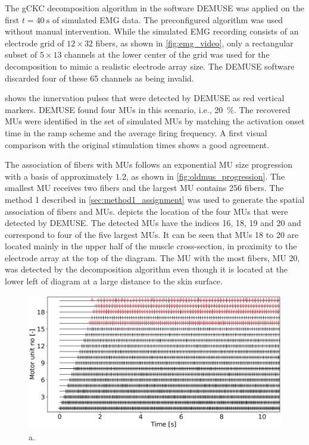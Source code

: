 The gCKC decomposition algorithm in the software DEMUSE was applied on the first $t=\SI{40}{\second}$ of simulated EMG data. The preconfigured algorithm was used without manual intervention.
While the simulated EMG recording consists of an electrode grid of $12 \times 32$ fibers, as shown in \cref{fig:emg_video}, only a rectangular subset of $5\times 13$ channels at the lower center of the grid was used for the decomposition to mimic a realistic electrode array size. The DEMUSE software discarded four of these 65 channels as being invalid.

 shows the innervation pulses that were detected by DEMUSE as red vertical markers. DEMUSE found four MUs in this scenario, i.e., \SI{20}{\percent}. 
The recovered MUs were identified in the set of simulated MUs by matching the activation onset time in the ramp scheme and the average firing frequency. A first visual comparison with the original stimulation times shows a good agreement.

The association of fibers with MUs follows an exponential MU size progression with a basis of approximately $1.2$, as shown in \cref{fig:oldmus_progression}. The smallest MU receives two fibers and the largest MU contains 256 fibers. The method 1 described in \cref{sec:method1_assignment} was used to generate the spatial association of fibers and MUs.  depicts the location of the four MUs that were detected by DEMUSE. The detected MUs have the indices 16, 18, 19 and 20 and correspond to four of the five largest MUs. It can be seen that MUs 18 to 20 are located mainly in the upper half of the muscle cross-section, in proximity to the electrode array at the top of the diagram.
The MU with the most fibers, MU 20, was detected by the decomposition algorithm even though it is located at the lower left of diagram at a large distance to the skin surface.

\begin{figure}
  \centering%
  \includegraphics[width=\textwidth]{images/results/application/emg_20mus-50s-old2.pdf}%
  \caption{a.}%
  \label{fig:emg_20mus-50s-old2}%
\end{figure}


